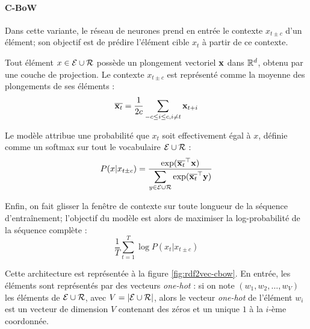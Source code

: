 \paragraph{C-BoW}

Dans cette variante, le réseau de neurones prend en entrée le contexte  $x_{t \pm c}$ d'un élément; son objectif est de prédire l'élément cible $x_t$ à partir de ce contexte.


Tout élément $x \in \Ent \cup \Rel$ possède un plongement vectoriel $\bf{x}$ dans $\R^d$, obtenu par une couche de projection. Le contexte $x_{t \pm c}$ est représenté comme la moyenne des plongements de ses éléments :
\begin{equation}
    \compconj{\bf{x}_t} = \frac{1}{2c} \sum_{-c \leq i \leq c, i \neq t} \bf{x}_{t+i}
\end{equation}

Le modèle attribue une probabilité que $x_t$ soit effectivement égal à $x$, définie comme un softmax sur tout le vocabulaire $\Ent \cup \Rel$ :
\begin{equation}
    P(x | x_{t \pm c}) = \frac{\displaystyle \exp(\compconj{\bf{x}_t}^\top \bf{x})}{\displaystyle \sum_{y \in \Ent \cup \Rel} \exp(\compconj{\bf{x}_t}^\top \bf{y})}
\end{equation}

Enfin, on fait glisser la fenêtre de contexte sur toute longueur de la séquence d'entraînement; l'objectif du modèle est alors de maximiser la log-probabilité de la séquence complète :
\begin{equation}
    \frac{1}{T} \sum_{t = 1}^{T} \log P(x_t | x_{t \pm c})
\end{equation}

Cette architecture est représentée à la figure \ref{fig:rdf2vec-cbow}. En entrée, les éléments sont représentés par des vecteurs \textit{one-hot} : si on note $(w_1, w_2, \ldots, w_V)$ les éléments de $\Ent \cup \Rel$, avec $V = | \Ent \cup \Rel |$, alors le vecteur \textit{one-hot} de l'élément $w_i$ est un vecteur de dimension $V$ contenant des zéros et un unique $1$ à la $i$-ème coordonnée.

